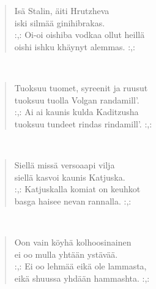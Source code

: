 \noindent\begin{minipage}{\linewidth}
\begin{verse}
	Isä Stalin, äiti Hrutzheva\\
	iski silmää ginihibrakas.\\
	\hspace{0pt-\widthof{:,: }}:,: Oi-oi oishiba vodkaa ollut heillä\\
	oishi ishku khäynyt alemmas. :,:\\
\end{verse}
\end{minipage}\\[10pt]
\noindent\begin{minipage}{\linewidth}
\begin{verse}
	Tuoksuu tuomet, syreenit ja ruusut\\
	tuoksuu tuolla Volgan randamill'.\\
	\hspace{0pt-\widthof{:,: }}:,: Ai ai kaunis kulda Kaditzusha\\
	tuoksuu tundeet rindas rindamill'. :,:\\
\end{verse}
\end{minipage}\\[10pt]
\noindent\begin{minipage}{\linewidth}
\begin{verse}
	Siellä missä versoaapi vilja\\
	siellä kasvoi kaunis Katjuska.\\
	\hspace{0pt-\widthof{:,: }}:,: Katjuskalla komiat on keuhkot\\
	basga haisee nevan rannalla. :,:\\
\end{verse}
\end{minipage}\\[10pt]
\noindent\begin{minipage}{\linewidth}
\begin{verse}
	Oon vain köyhä kolhoosinainen\\
	ei oo mulla yhtään ystävää.\\
	\hspace{0pt-\widthof{:,: }}:,: Ei oo lehmää eikä ole lammasta,\\
	eikä shuussa yhdään hammashta. :,:\\
\end{verse}
\end{minipage}\\[10pt]
